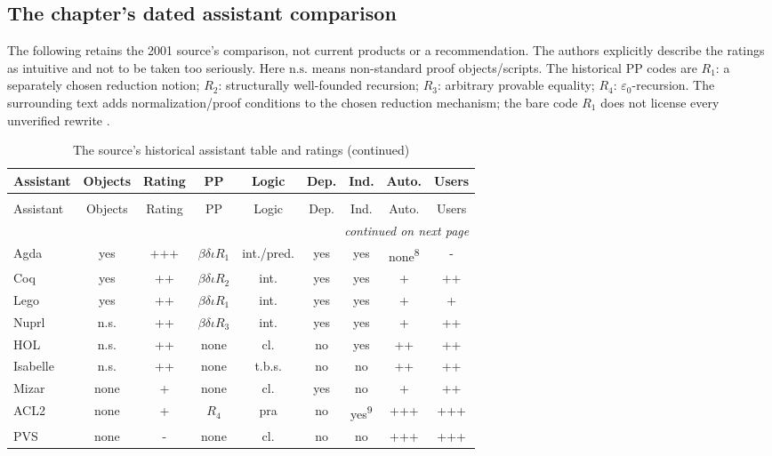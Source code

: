 




\subsection{The chapter's dated assistant comparison}

The following retains the 2001 source's comparison, not current products
or a recommendation. The authors explicitly describe the ratings as
intuitive and not to be taken too seriously. Here \(\mathrm{n.s.}\)
means non-standard proof objects/scripts. The historical PP codes are
\(R_1\): a separately chosen reduction notion; \(R_2\): structurally
well-founded recursion; \(R_3\): arbitrary provable equality;
\(R_4\): \(\varepsilon_0\)-recursion. The surrounding text adds
normalization/proof conditions to the chosen reduction mechanism;
the bare code \(R_1\) does not license every unverified rewrite
\cite[pp.~1224--1228]{BarendregtGeuvers2001}.

\begin{longtable}{@{}lcccccccc@{}}
\caption{The source's historical assistant table and ratings.}
\label{tab:p12-har-assistants}\\
\toprule
Assistant & Objects & Rating & PP & Logic & Dep. & Ind. & Auto. & Users\\
\midrule
\endfirsthead
\caption[]{The source's historical assistant table and ratings (continued)}\\
\toprule
Assistant & Objects & Rating & PP & Logic & Dep. & Ind. & Auto. & Users\\
\midrule
\endhead
\midrule\multicolumn{9}{r}{\emph{continued on next page}}\\
\endfoot
\endlastfoot
Agda & yes & +++ & \(\beta\delta\iota R_1\) & int./pred. & yes & yes & none\textsuperscript{8} & -\\
Coq & yes & ++ & \(\beta\delta\iota R_2\) & int. & yes & yes & + & ++\\
Lego & yes & ++ & \(\beta\delta\iota R_1\) & int. & yes & yes & + & +\\
Nuprl & n.s. & ++ & \(\beta\delta\iota R_3\) & int. & yes & yes & + & ++\\
HOL & n.s. & ++ & none & cl. & no & yes & ++ & ++\\
Isabelle & n.s. & ++ & none & t.b.s. & no & no & ++ & ++\\
Mizar & none & + & none & cl. & yes & no & + & ++\\
ACL2 & none & + & \(R_4\) & pra & no & yes\textsuperscript{9} & +++ & +++\\
PVS & none & - & none & cl. & no & no & +++ & +++\\
\bottomrule
\end{longtable}

